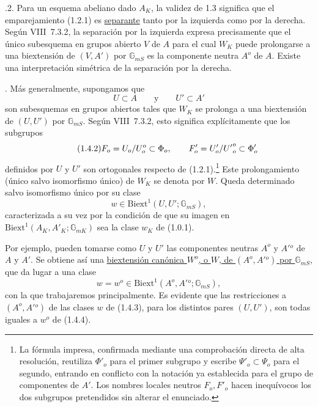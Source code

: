 \medskip
{}.2. Para un esquema abeliano dado $A_K$, la validez de 1.3 significa
que el emparejamiento (1.2.1) es \underline{separante} tanto por la
izquierda como por la derecha. Según VIII~7.3.2, la separación por la
izquierda expresa precisamente que el único subesquema en grupos
abierto $V$ de $A$ para el cual $W_K$ puede prolongarse a una
biextensión de $(V,A')$ por $\mathbb G_{mS}$ es la componente neutra
$A^o$ de $A$. Existe una interpretación simétrica de la separación
por la derecha.

\medskip
{}. Más generalmente, supongamos que
\begin{equation}\tag{1.4.1}
 U\subset A\qquad\text{y}\qquad U'\subset A'
\end{equation}
son subesquemas en grupos abiertos tales que $W_K$ se prolonga a una
biextensión de $(U,U')$ por $\mathbb G_{mS}$. Según VIII~7.3.2, esto
significa explícitamente que los subgrupos
\begin{equation}\tag{1.4.2}
 \sisi{\Phi'_o}{F_o}=U_o/U_o^o\subset\Phi_o,
 \qquad
 \sisi{\Psi'_o}{F'_o}=U'_o/{U'}_o^o
 \subset\sisi{\Psi_o}{\Phi'_o}
\end{equation}
definidos por $U$ y $U'$ son ortogonales respecto de (1.2.1).\footnote{La
fórmula impresa, confirmada mediante una comprobación directa de alta
resolución, reutiliza $\Phi'_o$ para el primer subgrupo y escribe
$\Psi'_o\subset\Psi_o$ para el segundo, entrando en conflicto con la
notación ya establecida para el grupo de componentes de $A'$. Los
nombres locales neutros $F_o,F'_o$ hacen inequívocos los dos subgrupos
pretendidos sin alterar el enunciado.} Este prolongamiento (único salvo
isomorfismo único) de $W_K$ se denota por $W$. Queda
determinado salvo isomorfismo único por su clase
\begin{equation}\tag{1.4.3}
 w\in\mathrm{Biext}^1(U,U';\mathbb G_{mS}),
\end{equation}
caracterizada a su vez por la condición de que su imagen en
$\mathrm{Biext}^1(A_K,A'_K;\mathbb G_{mK})$ sea la clase $w_K$ de
(1.0.1).

Por ejemplo, pueden tomarse como $U$ y $U'$ las componentes neutras
$A^o$ y $A'{}^o$ de $A$ y $A'$. Se obtiene así una
\underline{biextensión canónica $W^o$, o $W$, de $(A^o,A'{}^o)$ por
$\mathbb G_{mS}$}, que da lugar a una clase
\begin{equation}\tag{1.4.4}
 w=w^o\in\mathrm{Biext}^1(A^o,A'{}^o;\mathbb G_{mS}),
\end{equation}
con la que trabajaremos principalmente. Es evidente que las
restricciones a $(A^o,A'{}^o)$ de las clases $w$ de (1.4.3), para los
distintos pares $(U,U')$, son todas iguales a $w^o$ de (1.4.4).

